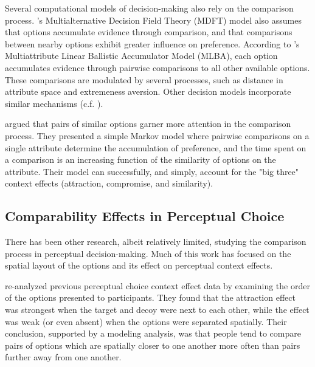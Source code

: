 Several computational models of decision-making also rely on the comparison process.  \textcite{roeMultialternativeDecisionField2001a}'s Multialternative Decision Field Theory (MDFT) model also assumes that options accumulate evidence through comparison, and that comparisons between nearby options exhibit greater influence on preference. According to \textcite{trueblood2014multiattribute}'s Multiattribute Linear Ballistic Accumulator Model (MLBA), each option accumulates evidence through pairwise comparisons to all other available options. These comparisons are modulated by several processes, such as distance in attribute space and extremeness aversion. Other decision models incorporate similar mechanisms \parencite{usherLossAversionInhibition2004a,noguchiMultialternativeDecisionSampling2018a,spektor2019similarity,wollschlager2NaryChoiceTree2012a,landry2021pairwise} (c.f. \textcite{bhatiaAssociationsAccumulationPreference2013b,bergnerVAMPVotingAgent2019b}). 

\textcite{trueblood2022attentional} argued that pairs of similar options garner more attention in the comparison process. They presented a simple Markov model where pairwise comparisons on a single attribute determine the accumulation of preference, and the time spent on a comparison is an increasing function of the similarity of options on the attribute. Their model can successfully, and simply, account for the "big three" context effects (attraction, compromise, and similarity).

\subsection{Comparability Effects in Perceptual Choice}
There has been other research, albeit relatively limited, studying the comparison process in perceptual decision-making. Much of this work has focused on the spatial layout of the options and its effect on perceptual context effects.

\textcite{trueblood2022attentional} re-analyzed previous perceptual choice context effect data \parencite{trueblood2015fragile} by examining the order of the options presented to participants. They found that the attraction effect was strongest when the target and decoy were next to each other, while the effect was weak (or even absent) when the options were separated spatially. Their conclusion, supported by a modeling analysis, was that people tend to compare pairs of options which are spatially closer to one another more often than pairs further away from one another. 

